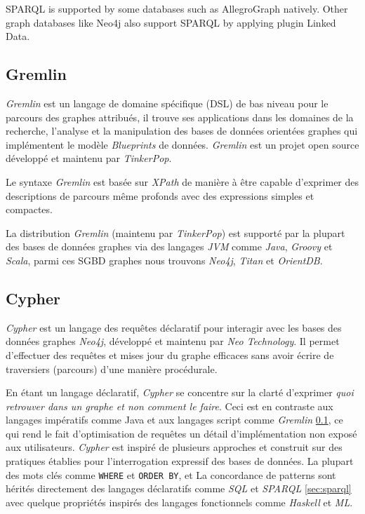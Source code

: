 
  {\color{red} \textsc{SPARQL} is supported by some databases such as
    AllegroGraph natively. Other graph databases like Neo4j also
    support \textsc{SPARQL} by applying plugin Linked Data.  }



  \subsection{Gremlin}
  \label{sec:gremlin}
  \emph{Gremlin} \cite{gremlin-wiki} est un langage de domaine
  spécifique (\acrshort{DSL}) de bas niveau pour le parcours des
  graphes attribués, il trouve ses applications dans les domaines de
  la recherche, l'analyse et la manipulation des bases de données
  orientées graphes qui implémentent le modèle \emph{Blueprints}
  \cite{blueprints} de données. \emph{Gremlin} \cite{gremlin-wiki} est
  un projet open source développé et maintenu par \emph{TinkerPop}.

  Le syntaxe \emph{Gremlin} est basée sur \emph{XPath} de manière à
  être capable d'exprimer des descriptions de parcours même profonds
  avec des expressions simples et compactes.


  La distribution \emph{Gremlin} (maintenu par \emph{TinkerPop}) est
  supporté par la plupart des bases de données graphes via des
  langages \emph{JVM} comme \emph{Java}, \emph{Groovy} et
  \emph{Scala}, parmi ces \acrshort{SGBD} graphes nous trouvons
  \emph{Neo4j}, \emph{Titan} et \emph{OrientDB}.

  \subsection{Cypher}
  \label{sec:cypher}
  \emph{Cypher} \cite{cypher-docs} est un langage des requêtes
  déclaratif pour interagir avec les bases des données graphes
  \emph{Neo4j}, développé et maintenu par \emph{Neo Technology}. Il
  permet d'effectuer des requêtes et mises jour du graphe efficaces
  sans avoir écrire de traversiers (parcours) d'une manière
  procédurale.

  En étant un langage déclaratif, \emph{Cypher} se concentre sur la
  clarté d'exprimer \textit{quoi retrouver dans un graphe et non
    comment le faire}. Ceci est en contraste aux langages impératifs
  comme Java et aux langages script comme \emph{Gremlin}
  \ref{sec:gremlin}, ce qui rend le fait d'optimisation de requêtes un
  détail d'implémentation non exposé aux utilisateurs. \emph{Cypher}
  est inspiré de plusieurs approches et construit sur des pratiques
  établies pour l'interrogation expressif des bases de données. La
  plupart des mots clés comme \verb|WHERE| et \verb|ORDER BY|, et La
  concordance de patterns sont hérités directement des langages
  déclaratifs comme \emph{SQL} et \emph{SPARQL} \ref{sec:sparql} avec
  quelque propriétés inspirés des langages fonctionnels comme
  \emph{Haskell} et \emph{ML}.

